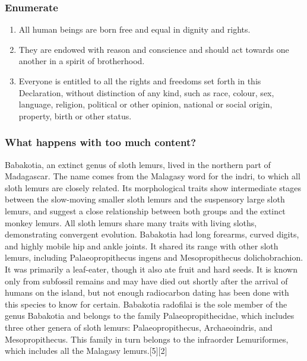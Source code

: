 \documentclass[handout,aspectratio=169]{beamer}
\begin{document}
\begin{frame}
    \frametitle{Enumerate}

    \begin{enumerate}[<+->]

        \item All human beings are born free and equal in dignity and rights.

        \item They are endowed with reason and conscience and should act
            towards one another in a spirit of brotherhood.

        \item Everyone is entitled to all the rights and freedoms set forth in
            this Declaration, without distinction of any kind, such as race,
            colour, sex, language, religion, political or other opinion,
            national or social origin, property, birth or other status.

    \end{enumerate}

\end{frame}

\begin{frame}[allowframebreaks]
    \frametitle{What happens with too much content?}

    Babakotia, an extinct genus of sloth lemurs, lived in the northern part of
    Madagascar. The name comes from the Malagasy word for the indri, to which
    all sloth lemurs are closely related. Its morphological traits show
    intermediate stages between the slow-moving smaller sloth lemurs and the
    suspensory large sloth lemurs, and suggest a close relationship between
    both groups and the extinct monkey lemurs. All sloth lemurs share many
    traits with living sloths, demonstrating convergent evolution. Babakotia
    had long forearms, curved digits, and highly mobile hip and ankle joints.
    It shared its range with other sloth lemurs, including Palaeopropithecus
    ingens and Mesopropithecus dolichobrachion. It was primarily a leaf-eater,
    though it also ate fruit and hard seeds. It is known only from subfossil
    remains and may have died out shortly after the arrival of humans on the
    island, but not enough radiocarbon dating has been done with this species
    to know for certain. Babakotia radofilai is the sole member of the genus
    Babakotia and belongs to the family Palaeopropithecidae, which includes
    three other genera of sloth lemurs: Palaeopropithecus, Archaeoindris, and
    Mesopropithecus. This family in turn belongs to the infraorder
    Lemuriformes, which includes all the Malagasy lemurs.[5][2]

\end{frame}
\end{document}
